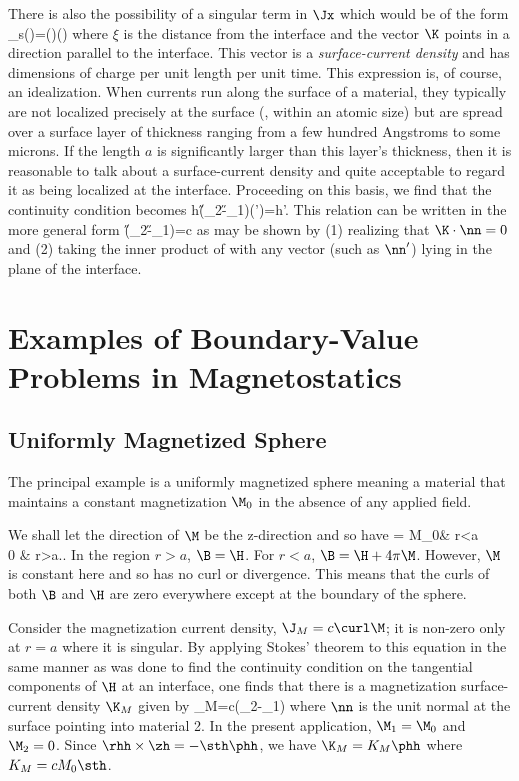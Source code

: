{There is also the possibility of a singular term in $\Jx$ which would be of
the form
\beq
\J_s(\x)=\K(\x)\de(\xi)
\eeq
where $\xi$ is the distance from the interface and the vector $\K$ points
in a direction parallel to the interface. This vector is a {\em
surface-current density} and has dimensions of charge per unit length per
unit time. This expression is, of course, an idealization. When currents
run along the surface of a material, they typically are not localized
precisely at the surface (\ie, within an atomic size) but are spread over a
surface layer of thickness ranging from a few hundred Angstroms to some
microns. If the length $a$ is significantly larger than this layer's
thickness, then it is reasonable to talk about a surface-current density
and quite acceptable to regard it as being localized at the interface.
Proceeding on this basis, we find that the continuity condition becomes
\beq
h(\H_2-\H_1)\cdot(\nn'\times\nn)=h\K\cdot\nn'.
\eeq
This relation can be written in the more general form
\beq
\nn\times(\H_2-\H_1)=\frac{4\pi}c\K
\eeq
as may be shown by (1) realizing that $\K\cdot\nn=0$ and (2) taking the inner
product of  with any vector (such as $\nn'$) lying in the
plane of the interface.

\section{Examples of Boundary-Value Problems in Magnetostatics}

\subsection{Uniformly Magnetized Sphere}

The principal example is a uniformly magnetized sphere meaning a material that
maintains a constant magnetization $\M_0$ in the absence of any applied
field. 

\centerline{}

\noindent We shall let the direction of $\M$ be the z-direction and so have
\beq
\Mx=\lec{} M_0\zh  & r<a\\0 & r>a.\ear \right.
\eeq
In the region $r>a$, $\B=\H$. For $r<a$, $\B=\H+4\pi\M$. However, $\M$ is
constant here and so has no curl or divergence. This means that the curls
of both $\B$ and $\H$ are zero everywhere except at the boundary of the
sphere.

Consider the magnetization current density, $\J_M=c\curl\M$; it is non-zero
only at $r=a$ where it is singular. By applying Stokes' theorem to this
equation in the same manner as was done to find the continuity condition on
the tangential components of $\H$ at an interface, one finds that there is
a magnetization surface-current density $\K_M$ given by
\beq
\K_M=c\nn\times(\M_2-\M_1)
\eeq
where $\nn$ is the unit normal at the surface pointing into material 2.
In the present application, $\M_1=\M_0$ and $\M_2=0$. Since $\rhh\times
\zh=-\sth\phh$, we have $\K_M=K_M\phh$ where $K_M=cM_0\sth$.

}
